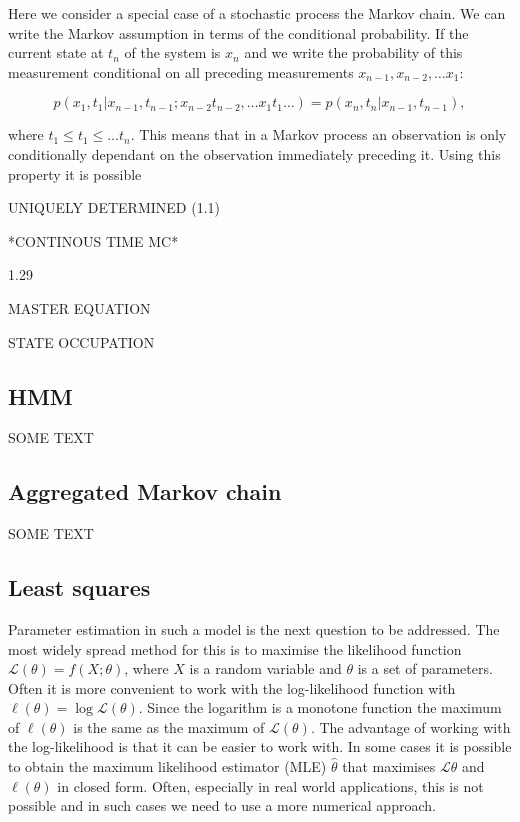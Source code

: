 Here we consider a special case of a stochastic process the Markov chain. We can write the Markov assumption in terms of the conditional probability. If the current state at $t_n$ of the system is $x_n$ and we write the probability of this measurement conditional on all preceding measurements $x_{n-1}, x_{n-2}, \ldots x_1$:

\begin{equation}
  \label{eq:stoch-joint}
  p(x_1, t_1 | x_{n-1}, t_{n-1}; x_{n-2} t_{n-2}, \ldots x_1 t_1 \ldots) = p(x_{n},t_{n}| x_{n-1},t_{n-1}),
\end{equation}

where $t_1 \le t_1 \le \ldots t_n$. This means that in a Markov process an observation is only conditionally dependant on the observation immediately preceding it. Using this property it is possible 

UNIQUELY DETERMINED (1.1)

*CONTINOUS TIME MC*

1.29

MASTER EQUATION

STATE OCCUPATION

\subsection{HMM}
\label{sec:hmm}

SOME TEXT

\subsection{Aggregated Markov chain}
\label{sec:aggr-mark-chain}

SOME TEXT

\subsection{Least squares}
\label{sec:least-squares}

Parameter estimation in such a model is the next question to be addressed. The most widely spread method for this is to maximise the likelihood function $ \mathcal{L}(\theta) = f(X; \theta) $, where $X$ is a random variable and $\theta$ is a set of parameters. Often it is more convenient to work with the log-likelihood function with $\ell (\theta) = \log \mathcal{L}(\theta)$. Since the logarithm is a monotone function the maximum of $\ell (\theta)$ is the same as the maximum of $\mathcal{L} (\theta)$. The advantage of working with the log-likelihood is that it can be easier to work with. In some cases it is possible to obtain the maximum likelihood estimator (MLE) $\hat{\theta}$ that maximises $\mathcal{L}{\theta}$ and $\ell (\theta)$ in closed form. Often, especially in real world applications, this is not possible and in such cases we need to use a more numerical approach. 

